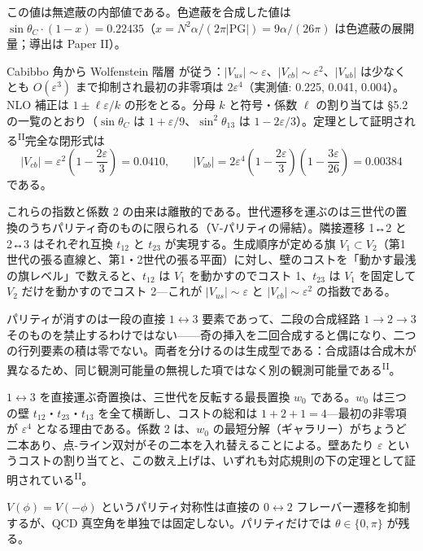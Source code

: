 \documentclass[fontsize=11pt,paper=a4,lualatex]{jlreq}
\newcommand{\PII}{\textsuperscript{\textup{II}}}
\begin{document}
この値は無遮蔽の内部値である。色遮蔽を合成した値は $\sin\theta_C \cdot (1-x) = 0.22435$（$x = N^2\alpha/(2\pi|\mathrm{PG}|) = 9\alpha/(26\pi)$ は色遮蔽の展開量；導出は Paper II）。

Cabibbo 角から Wolfenstein 階層 \cite{wolfenstein} が従う：$|V_{us}| \sim \varepsilon$、$|V_{cb}| \sim \varepsilon^2$、$|V_{ub}|$ は少なくとも $O(\varepsilon^3)$ まで抑制され最初の非零項は $2\varepsilon^4$（実測値: 0.225, 0.041, 0.004）。NLO 補正は $1 \pm \ell\varepsilon/k$ の形をとる。分母 $k$ と符号・係数 $\ell$ の割り当ては §5.2 の一覧のとおり（$\sin\theta_C$ は $1+\varepsilon/9$、$\sin^2\theta_{13}$ は $1-2\varepsilon/3$）。定理として証明される\PII{}完全な閉形式は
\begin{equation}
|V_{cb}| = \varepsilon^2\left(1-\frac{2\varepsilon}{3}\right) = 0.0410,\qquad
|V_{ub}| = 2\varepsilon^4\left(1-\frac{2\varepsilon}{3}\right)\left(1-\frac{3\varepsilon}{26}\right) = 0.00384
\end{equation}
である。

これらの指数と係数 2 の由来は離散的である。世代遷移を運ぶのは三世代の置換のうちパリティ奇のものに限られる（V-パリティの帰結）。隣接遷移 1↔2 と 2↔3 はそれぞれ互換 $t_{12}$ と $t_{23}$ が実現する。生成順序が定める旗 $V_1 \subset V_2$（第1世代の張る直線と、第1・2世代の張る平面）に対し、壁のコストを「動かす最浅の旗レベル」で数えると、$t_{12}$ は $V_1$ を動かすのでコスト 1、$t_{23}$ は $V_1$ を固定して $V_2$ だけを動かすのでコスト 2---これが $|V_{us}| \sim \varepsilon$ と $|V_{cb}| \sim \varepsilon^2$ の指数である。

パリティが消すのは一段の直接 $1 \leftrightarrow 3$ 要素であって、二段の合成経路 $1 \to 2 \to 3$ そのものを禁止するわけではない——奇の挿入を二回合成すると偶になり、二つの行列要素の積は零でない。両者を分けるのは生成型である：合成語は合成木が異なるため、同じ観測可能量の無視した項ではなく別の観測可能量である\PII{}。

$1 \leftrightarrow 3$ を直接運ぶ奇置換は、三世代を反転する最長置換 $w_0$ である。$w_0$ は三つの壁 $t_{12}$・$t_{23}$・$t_{13}$ を全て横断し、コストの総和は $1 + 2 + 1 = 4$---最初の非零項が $\varepsilon^4$ となる理由である。係数 2 は、$w_0$ の最短分解（ギャラリー）がちょうど二本あり、点-ライン双対がその二本を入れ替えることによる。壁あたり $\varepsilon$ というコストの割り当てと、この数え上げは、いずれも対応規則の下の定理として証明されている\PII{}。

$V(\phi) = V(-\phi)$ というパリティ対称性は直接の $0\leftrightarrow2$ フレーバー遷移を抑制するが、QCD 真空角を単独では固定しない。パリティだけでは $\theta\in\{0,\pi\}$ が残る。
\end{document}
